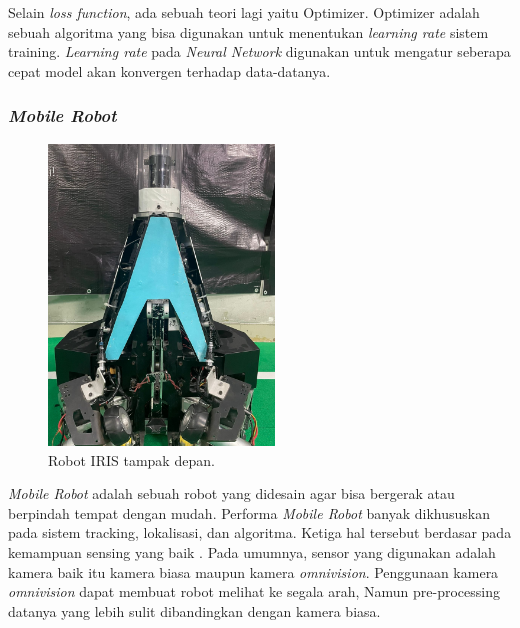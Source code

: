 Selain \emph{loss function}, ada sebuah teori lagi yaitu Optimizer. 
Optimizer adalah sebuah algoritma yang bisa digunakan untuk menentukan 
\emph{learning rate} sistem training. \emph{Learning rate} pada 
\emph{Neural Network} digunakan untuk mengatur seberapa cepat model 
akan konvergen terhadap data-datanya. 

\subsubsection{\emph{Mobile Robot}}
\label{sec:mobile_robot}
\begin{figure}[ht]
    \centering
  
    \includegraphics[width=6cm]{gambar/iris1.jpeg}
  
    \caption{Robot IRIS tampak depan.}
    \label{fig:mobile_robot}
\end{figure}
\emph{Mobile Robot} adalah sebuah robot yang didesain agar bisa bergerak 
atau berpindah tempat dengan mudah. Performa \emph{Mobile Robot} banyak 
dikhususkan pada sistem tracking, lokalisasi, dan algoritma. Ketiga 
hal tersebut berdasar pada kemampuan sensing yang baik \citet{ref_mobile_robot}. 
Pada umumnya, sensor yang digunakan adalah kamera baik itu kamera biasa 
maupun kamera \emph{omnivision}. Penggunaan kamera \emph{omnivision} dapat 
membuat robot melihat ke segala arah, Namun pre-processing datanya yang 
lebih sulit dibandingkan dengan kamera biasa.

